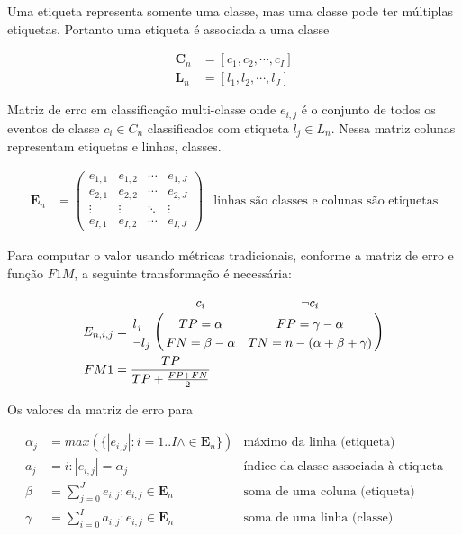 Uma etiqueta representa somente uma classe, mas uma classe pode ter múltiplas
etiquetas. Portanto uma etiqueta é associada a uma classe 

\begin{align}
  \mathbf{C}_n &= [c_1, c_2, \cdots, c_I]  \label{eq:classes} \\
  \mathbf{L}_n &= [l_1, l_2, \cdots, l_J]  \label{eq:labels}
\end{align}

Matriz de erro em classificação multi-classe onde $e_{i, j}$ é o conjunto de
todos os eventos de classe $c_i \in C_n$ classificados com etiqueta $l_j \in L_n$.
Nessa matriz colunas representam etiquetas e linhas, classes.

\begin{align}
  \mathbf{E}_n &= \begin{pmatrix}
    e_{1,1} & e_{1,2} & \cdots & e_{1,J} \\
    e_{2,1} & e_{2,2} & \cdots & e_{2,J} \\
    \vdots  & \vdots  & \ddots & \vdots  \\
    e_{I,1} & e_{I,2} & \cdots & e_{I,J} 
  \end{pmatrix}  \label{eq:error_matrix}
          & \text{linhas são classes e colunas são etiquetas}
\end{align}

Para computar o valor usando métricas tradicionais, conforme a matriz de erro e
função $F1M$, a seguinte transformação é necessária:

\begin{align}
  E_{n,i,j} &= \bordermatrix{~ & c_i & \neg c_i \cr
  l_j       & TP = \alpha           & FP = \gamma - \alpha                 \cr
  \neg l_j  & FN = \beta - \alpha   & TN = n - (\alpha + \beta + \gamma)  \cr} \\
  FM1       &= \frac{TP}{TP+\frac{FP+FN}{2}}
\end{align}

Os valores da matriz de erro para 

\begin{align}
  \alpha _j &= max( \{ |e_{i,j}|: i = 1 .. I \wedge \in \mathbf{E}_n \})
          & \text{máximo da linha (etiqueta)} \\
  a_j &= i: |e_{i,j}| = \alpha _j
          & \text{índice da classe associada à etiqueta} \\
  \beta   &= \sum_{j = 0}^{J} e_{i,j} : e_{i,j} \in \mathbf{E}_n
          & \text{soma de uma coluna (etiqueta)} \\
  \gamma  &= \sum_{i = 0}^{I} a_{i,j} : e_{i,j} \in \mathbf{E}_n
          & \text{soma de uma linha (classe)}
\end{align}

